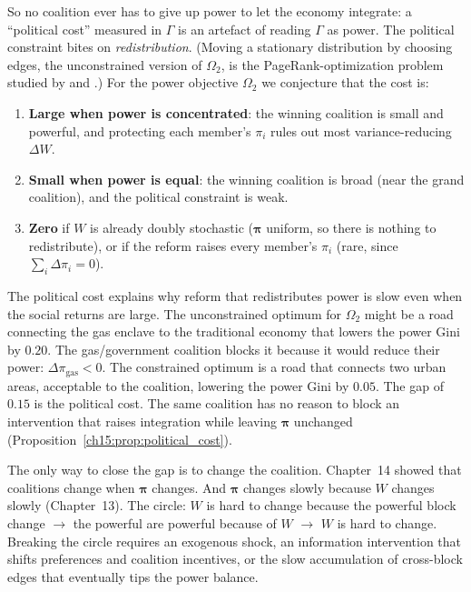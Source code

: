 \documentclass[../structural_economics_book.tex]{subfiles}
\begin{document}
So no coalition ever has to give up power to let the economy integrate: a ``political cost'' measured in $\Gamma$ is an artefact of reading $\Gamma$ as power. The political constraint bites on \emph{redistribution}. (Moving a stationary distribution by choosing edges, the unconstrained version of $\Omega_2$, is the PageRank-optimization problem studied by \citealp{dekerchove2008maximizing} and \citealp{csaji2014pagerank}.) For the power objective $\Omega_2$ we conjecture that the cost is:
\begin{enumerate}
\item \textbf{Large when power is concentrated}: the winning coalition is small and powerful, and protecting each member's $\pi_i$ rules out most variance-reducing $\Delta W$.
\item \textbf{Small when power is equal}: the winning coalition is broad (near the grand coalition), and the political constraint is weak.
\item \textbf{Zero} if $W$ is already doubly stochastic ($\boldsymbol{\pi}$ uniform, so there is nothing to redistribute), or if the reform raises every member's $\pi_i$ (rare, since $\sum_i\Delta\pi_i = 0$).
\end{enumerate}

\begin{intuition}
The political cost explains why reform that redistributes power is slow even when the social returns are large. The unconstrained optimum for $\Omega_2$ might be a road connecting the gas enclave to the traditional economy that lowers the power Gini by $0.20$. The gas/government coalition blocks it because it would reduce their power: $\Delta\pi_{\text{gas}} < 0$. The constrained optimum is a road that connects two urban areas, acceptable to the coalition, lowering the power Gini by $0.05$. The gap of $0.15$ is the political cost. The same coalition has no reason to block an intervention that raises integration while leaving $\boldsymbol{\pi}$ unchanged (Proposition~\ref{ch15:prop:political_cost}).

The only way to close the gap is to change the coalition. Chapter~14 showed that coalitions change when $\boldsymbol{\pi}$ changes. And $\boldsymbol{\pi}$ changes slowly because $W$ changes slowly (Chapter~13). The circle: $W$ is hard to change because the powerful block change $\to$ the powerful are powerful because of $W$ $\to$ $W$ is hard to change. Breaking the circle requires an exogenous shock, an information intervention that shifts preferences and coalition incentives, or the slow accumulation of cross-block edges that eventually tips the power balance.
\end{intuition}
\end{document}
